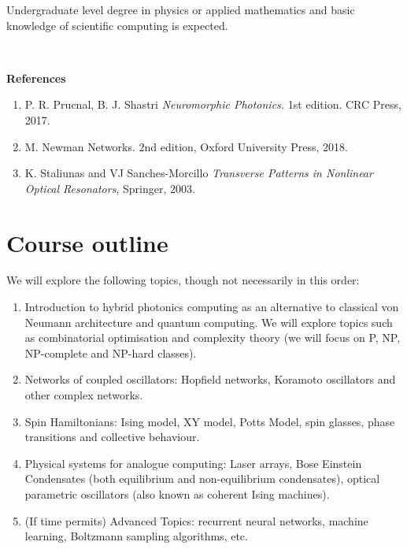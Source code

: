 \documentclass{article}
\begin{document}
\begin{titlepage}
        \noindent Undergraduate level degree in physics or applied mathematics and basic knowledge of scientific computing is expected.

        \ 

        \begin{flushleft}
          \Large \textbf{References}
        \end{flushleft}

        \begin{enumerate}
          \item P. R. Prucnal, B. J. Shastri \textit{Neuromorphic Photonics.} 1st edition. CRC Press, 2017.
          \item M. Newman \textit{}{Networks}. 2nd edition, Oxford University Press, 2018.
          \item K. Staliunas and VJ Sanches-Morcillo \textit{Transverse Patterns in Nonlinear Optical Resonators}, Springer, 2003.

        \end{enumerate}
        
        \vfill
    \end{titlepage}
  


  \setcounter{section}{-1}
  \section{Course outline}

  We will explore the following topics, though not necessarily in this order: 

  \begin{enumerate}
    \item Introduction to hybrid photonics computing as an alternative to classical von Neumann architecture and quantum computing. We will explore topics such as combinatorial optimisation and complexity theory (we will focus on P, NP, NP-complete and NP-hard classes). 
    \item Networks of coupled oscillators: Hopfield networks, Koramoto oscillators and other complex networks. 
    \item Spin Hamiltonians: Ising model, XY model, Potts Model, spin glasses, phase transitions and collective behaviour. 
    \item Physical systems for analogue computing: Laser arrays, Bose Einstein Condensates (both equilibrium and non-equilibrium condensates), optical parametric oscillators (also known as coherent Ising machines). 
    \item (If time permits) Advanced Topics: recurrent neural networks, machine learning, Boltzmann sampling algorithms, etc. 
  \end{enumerate}
\end{document}

